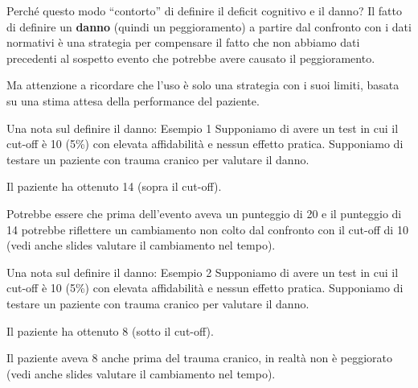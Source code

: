 \documentclass[
  ignorenonframetext,
  aspectratio=169,
]{beamer}
\begin{document}
\begin{frame}{Perché questo modo ``contorto'' di definire il deficit
cognitivo e il danno?}
\label{perchuxe9-questo-modo-contorto-di-definire-il-deficit-cognitivo-e-il-danno-4}
Il fatto di definire un \textbf{danno} (quindi un peggioramento) a
partire dal confronto con i dati normativi è una strategia per
compensare il fatto che non abbiamo dati precedenti al sospetto evento
che potrebbe avere causato il peggioramento.

Ma attenzione a ricordare che l'uso è solo una strategia con i suoi
limiti, basata su una stima attesa della performance del paziente.
\end{frame}

\begin{frame}{Una nota sul definire il danno: Esempio 1}
\label{una-nota-sul-definire-il-danno-esempio-1}
Supponiamo di avere un test in cui il cut-off è 10 (5\%) con elevata
affidabilità e nessun effetto pratica. Supponiamo di testare un paziente
con trauma cranico per valutare il danno.

Il paziente ha ottenuto 14 (sopra il cut-off).

Potrebbe essere che prima dell'evento aveva un punteggio di 20 e il
punteggio di 14 potrebbe riflettere un cambiamento non colto dal
confronto con il cut-off di 10 (vedi anche slides valutare il
cambiamento nel tempo).
\end{frame}

\begin{frame}{Una nota sul definire il danno: Esempio 2}
\label{una-nota-sul-definire-il-danno-esempio-2}
Supponiamo di avere un test in cui il cut-off è 10 (5\%) con elevata
affidabilità e nessun effetto pratica. Supponiamo di testare un paziente
con trauma cranico per valutare il danno.

Il paziente ha ottenuto 8 (sotto il cut-off).

Il paziente aveva 8 anche prima del trauma cranico, in realtà non è
peggiorato (vedi anche slides valutare il cambiamento nel tempo).
\end{frame}
\end{document}
